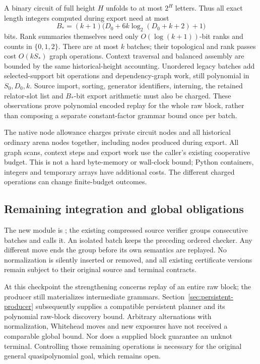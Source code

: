 A binary circuit of full height $H$ unfolds to at most $2^H$ letters.
Thus all exact length integers computed during export need at most
\[
 B_*=(k+1)\bigl(D_0+6k\log_2(D_0+k+2)+1\bigr)
\]
bits. Rank summaries themselves need only $O(\log(k+1))$-bit ranks and
counts in $\{0,1,2\}$. There are at most $k$ batches; their topological and
rank passes cost $O(kS_*)$ graph operations. Context traversal and balanced
assembly are bounded by the same historical-height accounting. Unordered
legacy batches add selected-support bit operations and dependency-graph work,
still polynomial in $S_0,D_0,k$. Source import, sorting, generator identifiers,
interning, the retained relator-slot list and $B_*$-bit export arithmetic must
also be charged. These observations prove polynomial encoded replay for the
whole raw block, rather than composing a separate constant-factor grammar
bound once per batch.

The native node allowance charges private circuit nodes and all historical
ordinary arena nodes together, including nodes produced during export.
All graph scans, context steps and export work use the caller's existing
cooperative budget. This is not a hard byte-memory or wall-clock bound;
Python containers, integers and temporary arrays have additional costs.
The different charged operations can change finite-budget outcomes.



\subsection{Remaining integration and global obligations}

The new module is ;
the existing compressed source verifier groups consecutive batches and calls
it. An isolated batch keeps the preceding ordered checker. Any different
move ends the group before its own semantics are replayed. No normalization
is silently inserted or removed, and all existing certificate versions remain
subject to their original source and terminal contracts.

At this checkpoint the strengthening concerns replay of an entire raw block;
the producer still materializes intermediate grammars.
Section~\ref{sec:persistent-producer} subsequently supplies a compatible
persistent planner and its polynomial raw-block discovery bound. Arbitrary
alternations with normalization, Whitehead moves and new exposures have not
received a comparable global bound. Nor does a supplied block guarantee an
unknot terminal. Controlling those remaining operations is necessary for the original general
quasipolynomial goal, which remains open.
